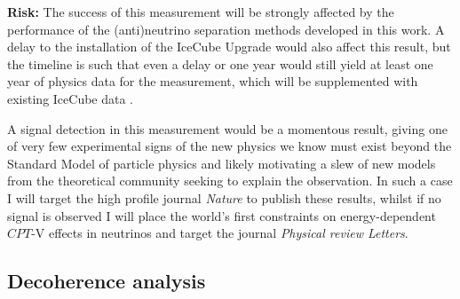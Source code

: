 \documentclass[a4paper,11pt]{article}
\begin{document}
\textbf{Risk:} The success of this measurement will be strongly affected by the performance of the (anti)neutrino separation methods developed in this work. A delay to the installation of the IceCube Upgrade would also affect this result, but the timeline is such that even a delay or one year would still yield at least one year of physics data for the measurement, which will be supplemented with existing IceCube data .

A signal detection in this measurement would be a momentous result, giving one of very few experimental signs of the new physics we know must exist beyond the Standard Model of particle physics and likely motivating a slew of new models from the theoretical community seeking to explain the observation. In such a case I will target the high profile journal \textit{Nature} to publish these results, whilst if no signal is observed I will place the world's first constraints on energy-dependent $CPT$-V effects in neutrinos and target the journal \textit{Physical review Letters}. \\

\subsection{Decoherence analysis}
\end{document}
